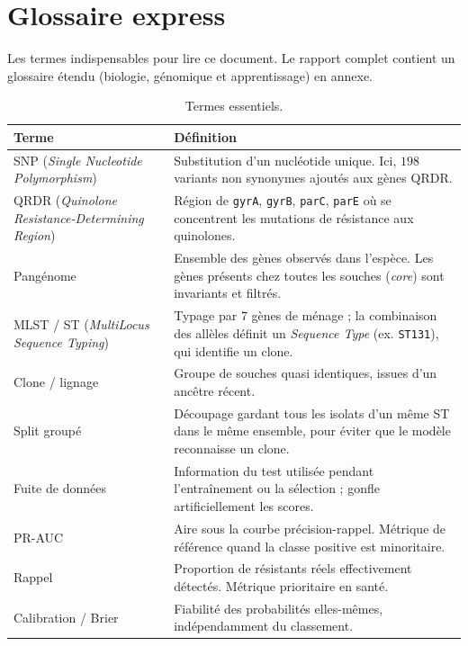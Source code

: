 \documentclass[11pt,a4paper]{article}
\begin{document}
\section{Glossaire express}

Les termes indispensables pour lire ce document. Le rapport complet contient un glossaire étendu (biologie, génomique et apprentissage) en annexe.

\begin{table}[H]
\centering
\caption{Termes essentiels.}
\label{tab:glossaire-express}
\small
\begin{tabularx}{\textwidth}{@{}>{\raggedright\arraybackslash}p{3.1cm}>{\raggedright\arraybackslash}X@{}}
\toprule
\textbf{Terme} & \textbf{Définition} \\
\midrule
SNP (\emph{Single Nucleotide Polymorphism}) & Substitution d'un nucléotide unique. Ici, $198$ variants non synonymes ajoutés aux gènes QRDR. \\
QRDR (\emph{Quinolone Resistance-Determining Region}) & Région de \texttt{gyrA}, \texttt{gyrB}, \texttt{parC}, \texttt{parE} où se concentrent les mutations de résistance aux quinolones. \\
Pangénome & Ensemble des gènes observés dans l'espèce. Les gènes présents chez toutes les souches (\emph{core}) sont invariants et filtrés. \\
MLST / ST (\emph{MultiLocus Sequence Typing}) & Typage par 7 gènes de ménage ; la combinaison des allèles définit un \emph{Sequence Type} (ex. \texttt{ST131}), qui identifie un clone. \\
Clone / lignage & Groupe de souches quasi identiques, issues d'un ancêtre récent. \\
Split groupé & Découpage gardant tous les isolats d'un même ST dans le même ensemble, pour éviter que le modèle reconnaisse un clone. \\
Fuite de données & Information du test utilisée pendant l'entraînement ou la sélection ; gonfle artificiellement les scores. \\
PR-AUC & Aire sous la courbe précision-rappel. Métrique de référence quand la classe positive est minoritaire. \\
Rappel & Proportion de résistants réels effectivement détectés. Métrique prioritaire en santé. \\
Calibration / Brier & Fiabilité des probabilités elles-mêmes, indépendamment du classement. \\

\end{tabularx}
\end{table}
\end{document}
